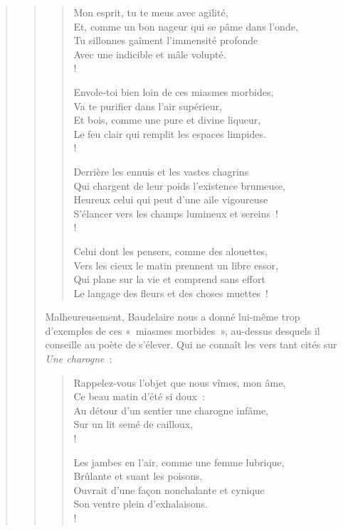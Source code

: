 \documentclass[french,twoside]{book} %
\begin{document}
\begin{verse}
\begin{verse}
\begin{verse}
Mon esprit, tu te meus avec agilité,\\
Et, comme un bon nageur qui se pâme dans l’onde,\\
Tu sillonnes gaîment l’immensité profonde\\
Avec une indicible et mâle volupté.\\!

Envole-toi bien loin de ces miasmes morbides,\\
Va te purifier dans l’air supérieur,\\
Et bois, comme une pure et divine liqueur,\\
Le feu clair qui remplit les espaces limpides.\\!

Derrière les ennuis et les vastes chagrins\\
Qui chargent de leur poids l’existence brumeuse,\\
Heureux celui qui peut d’une aile vigoureuse\\
S’élancer vers les champs lumineux et sereins !\\!

Celui dont les pensers, comme des alouettes,\\
Vers les cieux le matin prennent un libre essor,\\
Qui plane sur la vie et comprend sans effort\\
Le langage des fleurs et des choses muettes !\\
\end{verse}

\noindent Malheureusement, Baudelaire nous a donné lui-même trop d’exemples de ces « miasmes morbides », au-dessus desquels il conseille au poète de s’élever. Qui ne connaît les vers tant cités sur \emph{Une charogne} :\par


\begin{verse}
Rappelez-vous l’objet que nous vîmes, mon âme,\\
Ce beau matin d’été si doux :\\
Au détour d’un sentier une charogne infâme,\\
Sur un lit semé de cailloux,\\!

Les jambes en l’air, comme une femme lubrique,\\
Brûlante et suant les poisons,\\
Ouvrait d’une façon nonchalante et cynique\\
Son ventre plein d’exhalaisons.\\!


\end{verse}
\end{verse}
\end{verse}
\end{document}

